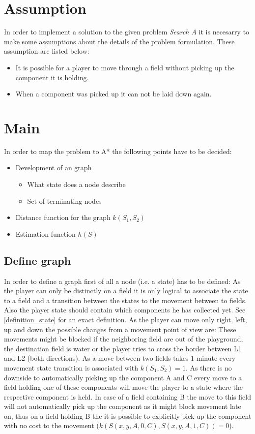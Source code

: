 \documentclass{article}
\begin{document}
\section{Assumption}
In order to implement a solution to the given problem \textit{Search A} it is necesarry to make some assumptions about the details of the problem formulation. These assumption are listed below:
\begin{itemize}
    \item It is possible for a player to move through a field without picking up the component it is holding. 
    \item When a component was picked up it can not be laid down again.
\end{itemize}


\section{Main}
In order to map the problem to A* the following points have to be decided:
\begin{itemize}
    \item Development of an graph
        \begin{itemize}
            \item What state does a node describe
            \item Set of terminating nodes
        \end{itemize}
    \item Distance function for the graph $k(S_1, S_2)$
    \item Estimation function $h(S)$
\end{itemize}

\subsection{Define graph}
In order to define a graph first of all a node (i.e. a state) has to be defined: As the player can only be distinctly on a field it is only logical to associate the state to a field and a transition between the states to the movement between to fields. Also the player state should contain which components he has collected yet. See \ref{definition_state} for an exact definition. As the player can move only right, left, up and down the possible changes from a movement point of view are:
These movements might be blocked if the neighboring field are out of the playground, the destination field is water or the player tries to cross the border between L1 and L2 (both directions).
As a move between two fields takes 1 minute every movement state transition is associated with $k(S_1, S_2) = 1$.
As there is no downside to automatically picking up the component A and C every move to a field holding one of these components will move the player to a state where the respective component is held. In case of a field containing B the move to this field will not automatically pick up the component as it might block movement late on, thus on a field holding B the it is possible to explicitly pick up the component with no cost to the movement ($k(S(x,y,A,0,C), S(x,y,A,1,C)) = 0$).
\end{document}
